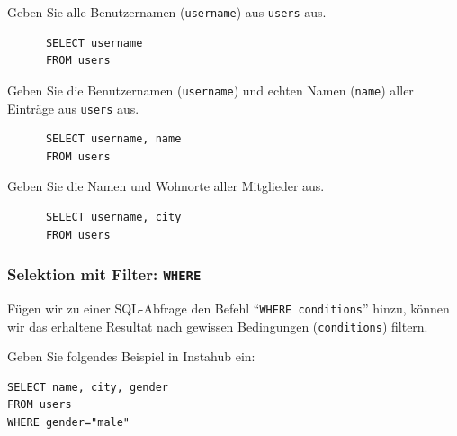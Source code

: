 \begin{myexercise}
  Geben Sie alle Benutzernamen (\texttt{username}) aus \texttt{users} aus.
  \begin{myanswer}
    \begin{lstlisting}
      SELECT username
      FROM users
      \end{lstlisting}
  \end{myanswer}
\end{myexercise}

\begin{myexercise}
  Geben Sie die Benutzernamen (\texttt{username}) und echten Namen (\texttt{name}) aller Einträge aus \texttt{users} aus.
  \begin{myanswer}
    \begin{lstlisting}
      SELECT username, name
      FROM users
    \end{lstlisting}
  \end{myanswer}
\end{myexercise}

\begin{myexercise}
  Geben Sie die Namen und Wohnorte aller Mitglieder aus.
  \begin{myanswer}
    \begin{lstlisting}
      SELECT username, city
      FROM users
    \end{lstlisting}
  \end{myanswer}
\end{myexercise}

\subsubsection*{Selektion mit Filter: \texorpdfstring{\lstinline|WHERE|}{WHERE}}
Fügen wir zu einer \gls{SQL}-Abfrage den Befehl ``\lstinline|WHERE conditions|'' hinzu, können wir das erhaltene Resultat nach gewissen Bedingungen (\texttt{conditions}) filtern.

\begin{myexample}
Geben Sie folgendes Beispiel in Instahub ein:

\begin{lstlisting}
SELECT name, city, gender
FROM users
WHERE gender="male"
\end{lstlisting}
\end{myexample}

